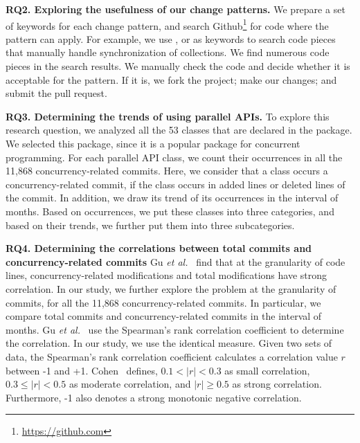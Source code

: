 \textbf{RQ2. Exploring the usefulness of our change patterns.} We prepare a set of keywords for each change pattern, and search Github\footnote{\url{https://github.com}} for code where the pattern can apply. For example, we use ,  or  as keywords to search code pieces that manually handle synchronization of collections. We find numerous code pieces in the search results. We manually check the code and decide whether it is acceptable for the pattern. If it is, we fork the project; make our changes; and submit the pull request.

\textbf{RQ3. Determining the trends of using parallel APIs.} To explore this research question, we analyzed all the 53 classes that are declared in the  package. We selected this package, since it is a popular package for concurrent programming. For each parallel API class, we count their occurrences in all the 11,868 concurrency-related commits. Here, we consider that a class occurs a concurrency-related commit, if the class occurs in added lines or deleted lines of the commit. In addition, we draw its trend of its occurrences in the interval of months. Based on occurrences, we put these classes into three categories, and based on their trends, we further put them into three subcategories.


\textbf{RQ4. Determining the correlations between total commits and concurrency-related commits} Gu \emph{et al.}~\cite{conf/sigsoft/GuJSZL15} find that at the granularity of code lines, concurrency-related modifications and total modifications have strong correlation. In our study, we further explore the problem at the granularity of commits, for all the 11,868 concurrency-related commits. In particular, we compare total commits and concurrency-related commits in the interval of months. Gu \emph{et al.}~\cite{conf/sigsoft/GuJSZL15} use the Spearman's rank correlation coefficient to determine the correlation. In our study, we use the identical measure. Given two sets of data, the Spearman's rank
correlation coefficient calculates a correlation value $r$ between -1 and +1. Cohen~\cite{bibid} defines, $0.1 < |r| < 0.3$ as small correlation, $0.3 \leq |r| < 0.5$ as moderate correlation, and $|r| \geq 0.5$ as strong correlation. Furthermore, -1 also denotes a strong monotonic negative correlation.





